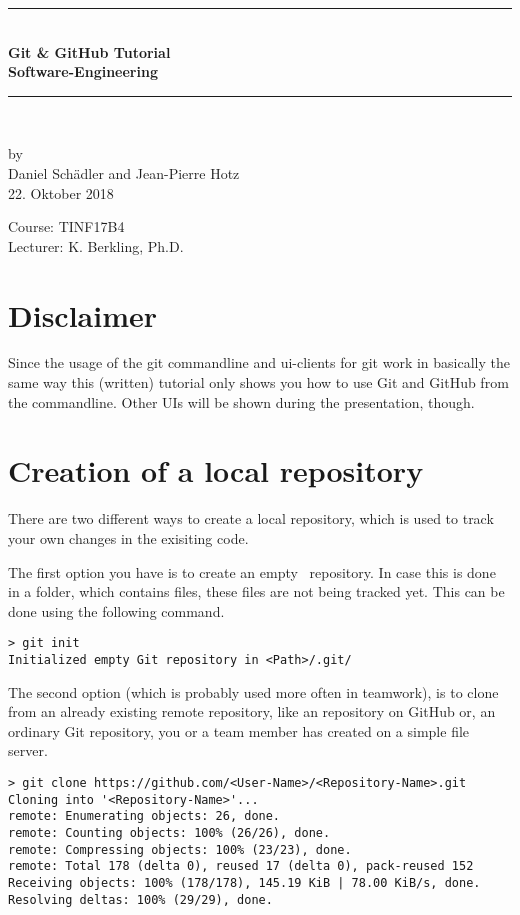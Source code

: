 \documentclass[a4paper, 12pt]{article}
\begin{document}
	
	
	\begin{center}
		\newcommand{\HRule}{\rule{\linewidth}{0.5mm}}
		\HRule \\[0.8cm]
		{ \huge \bfseries Git \& GitHub Tutorial}\\[0.4cm]
		{\LARGE \bfseries Software-Engineering}\\[0.4cm]
		\HRule \\[1.5cm]
		\begin{center}
			by\\[0.2cm]
			Daniel Schädler and Jean-Pierre Hotz\\[0.7cm]
			22. Oktober 2018
		\end{center}
		\vfill
		Course: TINF17B4\\
		Lecturer: K. Berkling, Ph.D.
	\end{center}
	\newpage
	\pagestyle{fancy}

	\section*{Disclaimer}
		
		Since the usage of the git commandline and ui-clients for git work in basically the same way this (written) tutorial only shows you how to use Git and GitHub from the commandline. Other UIs will be shown during the presentation, though.
	
	\section{Creation of a local repository}
	
		There are two different ways to create a local repository, which is used to track your own changes in the exisiting code.
		
		The first option you have is to create an \glqq empty\grqq~ repository. In case this is done in a folder, which contains files, these files are not being tracked yet. This can be done using the following command.
		
		\begin{lstlisting}
> git init
Initialized empty Git repository in <Path>/.git/
		\end{lstlisting}
		
		The second option (which is probably used more often in teamwork), is to clone from an already existing remote repository, like an repository on GitHub or, an ordinary Git repository, you or a team member has created on a simple file server.

		\begin{lstlisting}
> git clone https://github.com/<User-Name>/<Repository-Name>.git
Cloning into '<Repository-Name>'...
remote: Enumerating objects: 26, done.
remote: Counting objects: 100% (26/26), done.
remote: Compressing objects: 100% (23/23), done.
remote: Total 178 (delta 0), reused 17 (delta 0), pack-reused 152
Receiving objects: 100% (178/178), 145.19 KiB | 78.00 KiB/s, done.
Resolving deltas: 100% (29/29), done.
		\end{lstlisting}
	
\end{document}

